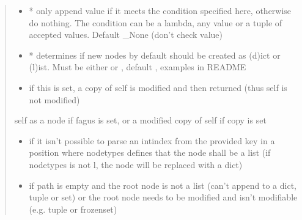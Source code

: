 \documentclass[a4paper,10pt,english]{sphinxmanual}
\begin{document}
\begin{fulllineitems}
\begin{fulllineitems}
\begin{quote}
\begin{description}
\begin{itemize}
\item {}
\sphinxAtStartPar
{} \textendash{} * only append value if it meets the condition specified here, otherwise do nothing. The condition
can be a lambda, any value or a tuple of accepted values. Default \_None (don’t check value)

\item {}
\sphinxAtStartPar
{} \textendash{} * determines if new nodes by default should be created as (d)ict or (l)ist. Must be
either  or , default , examples in README

\item {}
\sphinxAtStartPar
{} \textendash{} if this is set, a copy of self is modified and then returned (thus self is not modified)

\end{itemize}

\sphinxAtStartPar
self as a node if fagus is set, or a modified copy of self if copy is set

\begin{itemize}
\item {}
\sphinxAtStartPar
{} \textendash{} if it isn’t possible to parse an int\sphinxhyphen{}index from the provided key in a position where node\sphinxhyphen{}types
    defines that the node shall be a list (if node\sphinxhyphen{}types is not l, the node will be replaced with a dict)

\item {}
\sphinxAtStartPar
{} \textendash{} if path is empty and the root node is not a list (can’t append to a dict, tuple or set) or the
    root node needs to be modified and isn’t modifiable (e.g. tuple or frozenset)

\end{itemize}

\end{description}\end{quote}

\end{fulllineitems}



\end{fulllineitems}
\end{document}
